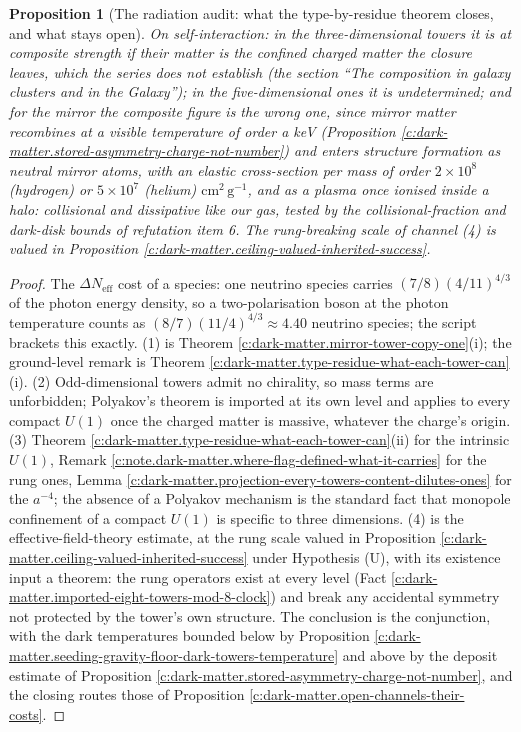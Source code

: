 \documentclass[11pt]{article}
\newtheorem{proposition}[theorem]{Proposition}
\theoremstyle{definition}
\theoremstyle{plain}
\providecommand{\Neff}{}\renewcommand{\Neff}{N_{\mathrm{eff}}}
\begin{document}
\begin{proposition}[The radiation audit: what the type-by-residue theorem closes, and what stays open]
On self-interaction: in the three-dimensional towers it is at composite strength if their matter is the confined charged matter the closure leaves, which the series does not establish (the section ``The composition in galaxy clusters and in the Galaxy''); in the five-dimensional ones it is undetermined; and for the mirror the composite figure is the wrong one, since mirror matter recombines at a visible temperature of order a keV (Proposition \ref{c:dark-matter.stored-asymmetry-charge-not-number}) and enters structure formation as neutral mirror atoms, with an elastic cross-section per mass of order $2 \times 10^{8}$ (hydrogen) or $5 \times 10^{7}$ (helium) $\mathrm{cm^{2}\,g^{-1}}$, and as a plasma once ionised inside a halo: collisional and dissipative like our gas, tested by the collisional-fraction and dark-disk bounds of refutation item 6. The rung-breaking scale of channel (4) is valued in Proposition \ref{c:dark-matter.ceiling-valued-inherited-success}.
\end{proposition}
\begin{proof}
The $\Delta\Neff$ cost of a species: one neutrino species carries $(7/8)(4/11)^{4/3}$ of the photon energy density, so a two-polarisation boson at the photon temperature counts as $(8/7)(11/4)^{4/3} \approx 4.40$ neutrino species; the script brackets this exactly. (1) is Theorem \ref{c:dark-matter.mirror-tower-copy-one}(i); the ground-level remark is Theorem \ref{c:dark-matter.type-residue-what-each-tower-can}(i). (2) Odd-dimensional towers admit no chirality, so mass terms are unforbidden; Polyakov's theorem is imported at its own level and applies to every compact $U(1)$ once the charged matter is massive, whatever the charge's origin. (3) Theorem \ref{c:dark-matter.type-residue-what-each-tower-can}(ii) for the intrinsic $U(1)$, Remark \ref{c:note.dark-matter.where-flag-defined-what-it-carries} for the rung ones, Lemma \ref{c:dark-matter.projection-every-towers-content-dilutes-ones} for the $a^{-4}$; the absence of a Polyakov mechanism is the standard fact that monopole confinement of a compact $U(1)$ is specific to three dimensions. (4) is the effective-field-theory estimate, at the rung scale valued in Proposition \ref{c:dark-matter.ceiling-valued-inherited-success} under Hypothesis (U), with its existence input a theorem: the rung operators exist at every level (Fact \ref{c:dark-matter.imported-eight-towers-mod-8-clock}) and break any accidental symmetry not protected by the tower's own structure. The conclusion is the conjunction, with the dark temperatures bounded below by Proposition \ref{c:dark-matter.seeding-gravity-floor-dark-towers-temperature} and above by the deposit estimate of Proposition \ref{c:dark-matter.stored-asymmetry-charge-not-number}, and the closing routes those of Proposition \ref{c:dark-matter.open-channels-their-costs}.

\end{proof}
\end{document}
